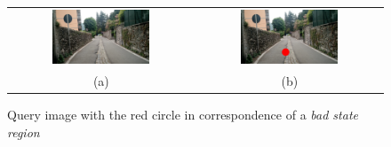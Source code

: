 \begin{figure}[t]
\centering
\begin{tabular}{cc}
\includegraphics[width=0.55\textwidth]{./img/ch-further/1461225656475_MEP_IMAGE}&
\includegraphics[width=0.55\textwidth]{./img/ch-further/1461225656475_MEP_IMAGE_with_mark}\\
(a)&(b)\\
\end{tabular}
\caption{Query image with the red circle in correspondence of a \emph{bad state region}}
\label{fig:mep_project}
\end{figure}

